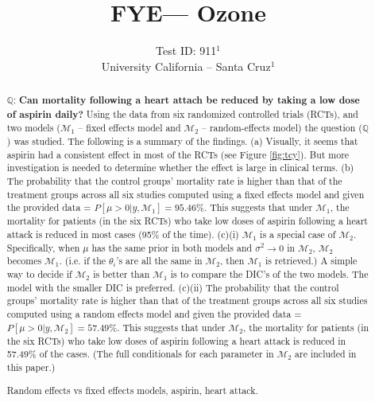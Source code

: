 \documentclass{../../tex_template/asaproc}
\title{FYE--- Ozone}
\author{
  Test ID: 911$^1$\\
  University California -- Santa Cruz$^1$\\
}
\newcommand{\bk}[1]{\left[#1\right]}
\newcommand{\M}{\mathcal{M}}
\newcommand{\Q}{\mathbb{Q}}
\begin{document}
\maketitle
\begin{abstract}
$\Q$: \textbf{Can mortality following a heart attach be reduced by taking a low
dose of aspirin daily?} Using the data from six randomized controlled trials
(RCTs), and two models ($\M_1$ -- fixed effects model and $\M_2$ --
random-effects model) the question ($\Q$) was studied. The following is a
summary of the findings. (a) Visually, it seems that aspirin had a consistent
effect in most of the RCTs (see Figure \ref{fig:tcy}). But more investigation
is needed to determine whether the effect is large in clinical terms. (b) The
probability that the control groups' mortality rate is higher than that of the
treatment groups across all six studies computed using a fixed effects model
and given the provided data = $P\bk{\mu > 0 | y, \M_1} = 95.46\%$. This
suggests that under $\M_1$, the mortality for patients (in the six RCTs) who
take low doses of aspirin following a heart attack is reduced in most cases
(95\% of the time). (c)(i) $\M_1$ is a special case of $\M_2$. Specifically,
when $\mu$ has the same prior in both models and $\sigma^2 \rightarrow 0$ in
$\M_2$, $\M_2$ becomes $\M_1$. (i.e. if the $\theta_i$'s are all the same in
$\M_2$, then $\M_1$ is retrieved.) A simple way to decide if $\M_2$ is better
than $\M_1$ is to compare the DIC's of the two models. The model with the
smaller DIC is preferred. (c)(ii) The probability that the control groups'
mortality rate is higher than that of the treatment groups across all six
studies computed using a random effects model and given the provided data =
$P\bk{\mu > 0 | y, \M_2} = 57.49\%$. This suggests that under $\M_2$, the
mortality for patients (in the six RCTs) who take low doses of aspirin
following a heart attack is reduced in 57.49\% of the cases. (The full
conditionals for each parameter in $\M_2$ are included in this paper.)

\begin{keywords}
Random effects vs fixed effects models, aspirin, heart attack.
\end{keywords}
\end{abstract}
\end{document}
